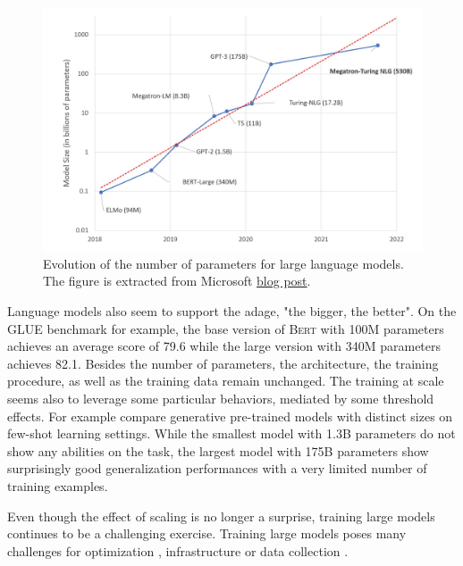 \begin{figure}[htb!]
	\includegraphics[width=\textwidth]{images/model-size-graph.jpeg}
	\caption[Large models number of parameters]{Evolution of the number of parameters for large language models. The figure is extracted from Microsoft \href{https://www.microsoft.com/en-us/research/blog/using-deepspeed-and-megatron-to-train-megatron-turing-nlg-530b-the-worlds-largest-and-most-powerful-generative-language-model/}{blog post}.}
\end{figure}

Language models also seem to support the adage, "the bigger, the better". On the GLUE benchmark for example, the base version of \textsc{Bert} with 100M parameters achieves an average score of 79.6 while the large version with 340M parameters achieves 82.1. Besides the number of parameters, the architecture, the training procedure, as well as the training data remain unchanged. The training at scale seems also to leverage some particular behaviors, mediated by some threshold effects. For example \textcite{brown_20} compare generative pre-trained models with distinct sizes on few-shot learning settings. While the smallest model with 1.3B parameters do not show any abilities on the task, the largest model with 175B parameters show surprisingly good generalization performances with a very limited number of training examples.

Even though the effect of scaling is no longer a surprise, training large models continues to be a challenging exercise. Training large models poses many challenges for optimization \parencite{you_20}, infrastructure \parencite{shoeybi_19, narayanan_21} or data collection \parencite{OrtizSuarezSagotRomary2019}. 


